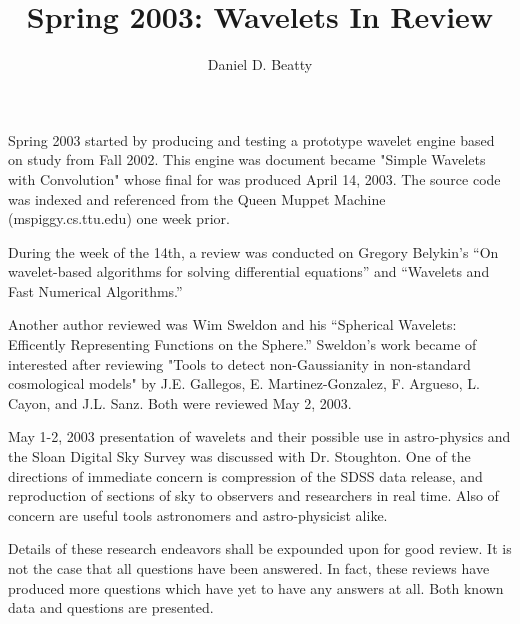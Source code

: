 \documentclass[11pt]{article}
\title{Spring 2003: Wavelets In Review}
\author{Daniel D. Beatty}
\begin{document}
\maketitle

Spring 2003 started by producing and testing a prototype wavelet engine based on study from Fall 2002.  This engine was document became "Simple Wavelets with Convolution" whose final for was produced April 14, 2003.  The source code was indexed and referenced from the Queen Muppet Machine (mspiggy.cs.ttu.edu) one week prior.  

During the week of the 14th, a review was conducted on Gregory Belykin's ``On wavelet-based algorithms for solving differential equations'' and ``Wavelets and Fast Numerical Algorithms.''  

Another author reviewed was Wim Sweldon and his ``Spherical Wavelets: Efficently Representing Functions on the Sphere.''  Sweldon's work became of interested after reviewing "Tools to detect non-Gaussianity in non-standard cosmological models" by J.E. Gallegos, E. Martinez-Gonzalez, F. Argueso,  L. Cayon, and J.L. Sanz. Both were reviewed May 2, 2003.  

May 1-2, 2003 presentation of wavelets and their possible use in astro-physics and the Sloan Digital Sky Survey was discussed with Dr. Stoughton.  One of the directions of immediate concern is compression of the SDSS data release, and reproduction of sections of sky to observers and researchers in real time.  Also of concern are useful tools astronomers and astro-physicist alike.  

Details of these research endeavors shall be expounded upon for good review.  It is not the case that all questions have been answered.  In fact, these reviews have produced more questions which have yet to have any answers at all.  Both known data and questions are presented.  


\end{document}
